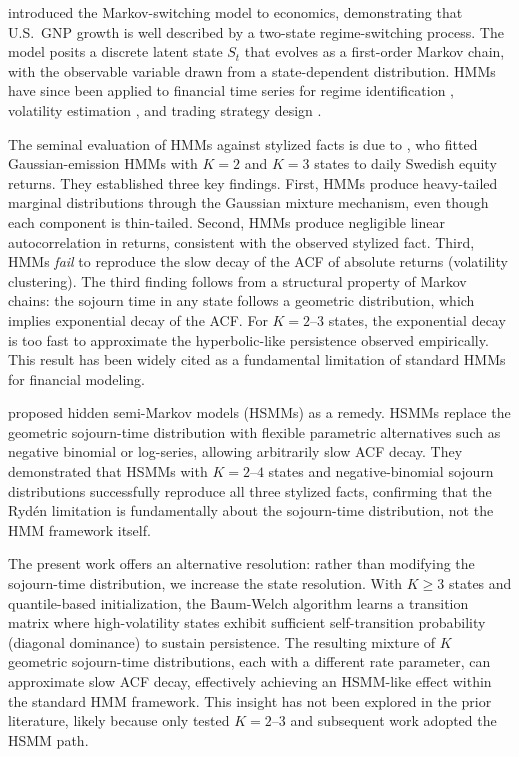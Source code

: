 \citet{hamilton1989new} introduced the Markov-switching model to economics, demonstrating that U.S.\ GNP growth is well described by a two-state regime-switching process.
The model posits a discrete latent state $S_t$ that evolves as a first-order Markov chain, with the observable variable drawn from a state-dependent distribution.
HMMs have since been applied to financial time series for regime identification \cite{kim1999has}, volatility estimation \cite{rossi2006volatility}, and trading strategy design \cite{nguyen2018hidden}.

The seminal evaluation of HMMs against stylized facts is due to \citet{ryden1998stylized}, who fitted Gaussian-emission HMMs with $K = 2$ and $K = 3$ states to daily Swedish equity returns.
They established three key findings.
First, HMMs produce heavy-tailed marginal distributions through the Gaussian mixture mechanism, even though each component is thin-tailed.
Second, HMMs produce negligible linear autocorrelation in returns, consistent with the observed stylized fact.
Third, HMMs \emph{fail} to reproduce the slow decay of the ACF of absolute returns (volatility clustering).
The third finding follows from a structural property of Markov chains: the sojourn time in any state follows a geometric distribution, which implies exponential decay of the ACF.
For $K = 2$--$3$ states, the exponential decay is too fast to approximate the hyperbolic-like persistence observed empirically.
This result has been widely cited as a fundamental limitation of standard HMMs for financial modeling.

\citet{bulla2006stylized} proposed hidden semi-Markov models (HSMMs) as a remedy.
HSMMs replace the geometric sojourn-time distribution with flexible parametric alternatives such as negative binomial or log-series, allowing arbitrarily slow ACF decay.
They demonstrated that HSMMs with $K = 2$--$4$ states and negative-binomial sojourn distributions successfully reproduce all three stylized facts, confirming that the Ryd\'{e}n limitation is fundamentally about the sojourn-time distribution, not the HMM framework itself.

The present work offers an alternative resolution: rather than modifying the sojourn-time distribution, we increase the state resolution.
With $K \geq 3$ states and quantile-based initialization, the Baum-Welch algorithm learns a transition matrix where high-volatility states exhibit sufficient self-transition probability (diagonal dominance) to sustain persistence.
The resulting mixture of $K$ geometric sojourn-time distributions, each with a different rate parameter, can approximate slow ACF decay, effectively achieving an HSMM-like effect within the standard HMM framework.
This insight has not been explored in the prior literature, likely because \citet{ryden1998stylized} only tested $K = 2$--$3$ and subsequent work adopted the HSMM path.

